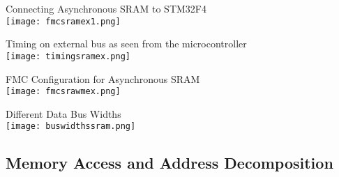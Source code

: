 \begin{example2}{Connecting Asynchronous SRAM to STM32F4}\\
    \texttt{[image: fmcsramex1.png]}
\end{example2}

\begin{example2}{Timing on external bus} as seen from the microcontroller\\
    \texttt{[image: timingsramex.png]}
\end{example2}

\begin{example2}{FMC Configuration for Asynchronous SRAM}\\
    \texttt{[image: fmcsrawmex.png]}
\end{example2}

\begin{concept}{Different Data Bus Widths}\\
    \texttt{[image: buswidthssram.png]}
\end{concept}




\subsection{Memory Access and Address Decomposition}


